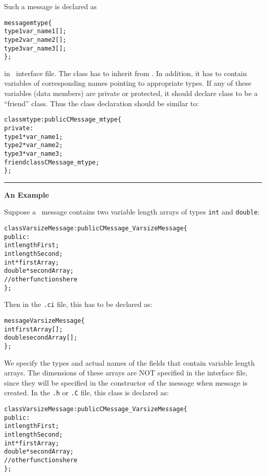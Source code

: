 Such a message is declared as 

\begin{alltt}
 message mtype \{
   type1 var_name1[];
   type2 var_name2[];
   type3 var_name3[];
 \};
\end{alltt}

in \charmpp\ interface file. The class  has to inherit from
. In addition, it has to contain variables of corresponding
names pointing to appropriate types. If any of these variables (data members)
are private or protected, it should declare class  to be a
``friend'' class. Thus the  class declaration should be similar to:

\begin{alltt}
class mtype : public CMessage_mtype \{
 private:
   type1 *var_name1;
   type2 *var_name2;
   type3 *var_name3;
   friend class CMessage_mtype;
\};
\end{alltt}

\small
\hrule

\noindent\textbf{An Example}

Suppose a \charmpp\ message contains two variable length arrays of types
\texttt{int} and \texttt{double}:

\begin{alltt} 
class VarsizeMessage: public CMessage_VarsizeMessage \{
  public:
    int lengthFirst;
    int lengthSecond;
    int* firstArray;
    double* secondArray;
    // other functions here
\};
\end{alltt}

Then in the \texttt{.ci} file, this has to be declared as: 

\begin{alltt}
message VarsizeMessage \{
  int firstArray[];
  double secondArray[];
\};
\end{alltt}

We specify the types and actual names of the fields that
contain variable length arrays. The dimensions of these arrays are NOT
specified in the interface file, since they will be specified in the
constructor of the message when message is created. In the {\tt .h} or {\tt .C}
file, this class is declared as:

\begin{alltt} 

class VarsizeMessage : public CMessage_VarsizeMessage \{ 
  public: 
    int lengthFirst;
    int lengthSecond;
    int* firstArray;
    double* secondArray;
    // other functions here
\};
\end{alltt}

